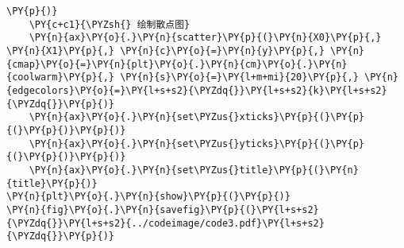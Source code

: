 \begin{Verbatim}[commandchars=\\\{\}]
    \PY{p}{)}
    \PY{c+c1}{\PYZsh{} 绘制散点图}
    \PY{n}{ax}\PY{o}{.}\PY{n}{scatter}\PY{p}{(}\PY{n}{X0}\PY{p}{,} \PY{n}{X1}\PY{p}{,} \PY{n}{c}\PY{o}{=}\PY{n}{y}\PY{p}{,} \PY{n}{cmap}\PY{o}{=}\PY{n}{plt}\PY{o}{.}\PY{n}{cm}\PY{o}{.}\PY{n}{coolwarm}\PY{p}{,} \PY{n}{s}\PY{o}{=}\PY{l+m+mi}{20}\PY{p}{,} \PY{n}{edgecolors}\PY{o}{=}\PY{l+s+s2}{\PYZdq{}}\PY{l+s+s2}{k}\PY{l+s+s2}{\PYZdq{}}\PY{p}{)}
    \PY{n}{ax}\PY{o}{.}\PY{n}{set\PYZus{}xticks}\PY{p}{(}\PY{p}{(}\PY{p}{)}\PY{p}{)}
    \PY{n}{ax}\PY{o}{.}\PY{n}{set\PYZus{}yticks}\PY{p}{(}\PY{p}{(}\PY{p}{)}\PY{p}{)}
    \PY{n}{ax}\PY{o}{.}\PY{n}{set\PYZus{}title}\PY{p}{(}\PY{n}{title}\PY{p}{)}
\PY{n}{plt}\PY{o}{.}\PY{n}{show}\PY{p}{(}\PY{p}{)}
\PY{n}{fig}\PY{o}{.}\PY{n}{savefig}\PY{p}{(}\PY{l+s+s2}{\PYZdq{}}\PY{l+s+s2}{../codeimage/code3.pdf}\PY{l+s+s2}{\PYZdq{}}\PY{p}{)}
\end{Verbatim}
